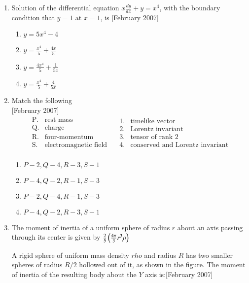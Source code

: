 \documentclass[journal]{IEEEtran}
\begin{document}
\begin{enumerate}
\item Solution of the differential equation $ x \frac{dy}{dx} + y = x^4 $, with the boundary condition that $ y = 1 $ at  $x = 1$, is \hfill[February 2007]
\begin{enumerate}
\item $  y = 5x^4 - 4$
\item $ y = \frac{x^4}{5} + \frac{4x}{5} $
\item $  y = \frac{4x^4}{5} + \frac{1}{5x} $
\item $ y = \frac{x^4}{5} + \frac{4}{5x} $
\end{enumerate} 
\item Match the following \\ \hfill[February 2007] \[
\begin{array}{cl}
\text{P.} & \text{rest mass} \\
\text{Q.} & \text{charge} \\
\text{R.} & \text{four-momentum} \\
\text{S.} & \text{electromagnetic field} \\
\end{array}
\quad
\begin{array}{cl}
1. & \text{timelike vector} \\
2. & \text{Lorentz invariant} \\
3. & \text{tensor of rank 2} \\
4. & \text{conserved and Lorentz invariant} \\
\end{array}
\]
\begin{enumerate}
    \item $P-2,Q-4,R-3,S-1$
    \item $P-4,Q-2,R-1,S-3$
    \item $P-2,Q-4,R-1,S-3$
    \item $P-4,Q-2,R-3,S-1$
    \end{enumerate}

\item The moment of inertia of a uniform sphere of radius  $r$ about an axis passing through its center is given by 
$\frac{2}{5} \left(\frac{4\pi}{3} r^3 \rho \right)$ 

A rigid sphere of uniform mass density $rho$ and radius  $R$ has two smaller spheres of radius $ R/2$  hollowed out of it, as shown in the figure. The moment of inertia of the resulting body about the $Y$ axis is:\hfill[February 2007]
\begin{center}
\end{center}
\end{enumerate}
\end{document}
